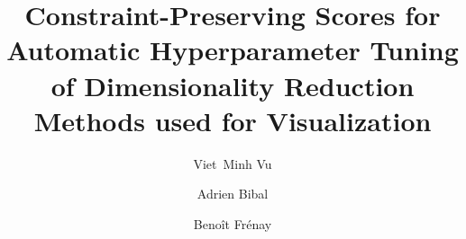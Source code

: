 \documentclass[a4paper,fleqn]{cas-dc}
\begin{document}
\let\WriteBookmarks\relax
\def\floatpagepagefraction{1}
\def\textpagefraction{.001}

\title[mode = title]{Constraint-Preserving Scores for Automatic Hyperparameter Tuning of Dimensionality Reduction Methods used for Visualization}

\author[]{Viet~Minh Vu}
\author{Adrien Bibal}
\author{Beno\^it Fr\'enay}

\address[]{NADI Institute - PReCISE Research Center, Faculty of Computer Science, University of Namur, Rue Grandgagnage 21, 5000 Namur, Belgium}




\maketitle
% 



\appendix
% 

%






% 
\end{document}

